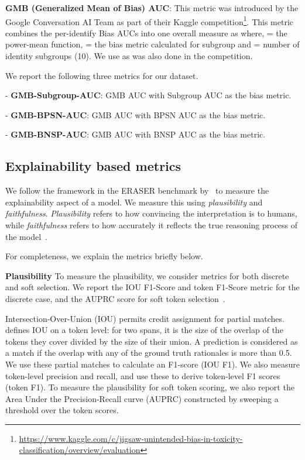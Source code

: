 \documentclass[letterpaper]{article} \usepackage{aaai21}  \usepackage{times}  \usepackage{helvet} \usepackage{courier}  \usepackage[hyphens]{url}  \usepackage{graphicx} \urlstyle{rm} \def\UrlFont{\rm}  \usepackage{natbib}  \usepackage{caption}
\begin{document}
\noindent\textbf{GMB (Generalized Mean of Bias) AUC}: This metric was introduced by the Google Conversation AI Team as part of their Kaggle competition\footnote{\url{https://www.kaggle.com/c/jigsaw-unintended-bias-in-toxicity-classification/overview/evaluation}}. This metric combines the per-identify Bias AUCs into one overall measure as  where,   = the  power-mean function,  = the bias metric  calculated for subgroup  and
 = number of identity subgroups (10). We use  as was also done in the competition.



\noindent We report the following three metrics for our dataset.
\begin{compactitem}
    \item[-] \textbf{GMB-Subgroup-AUC}: GMB AUC with Subgroup AUC as the bias metric.
    \item[-] \textbf{GMB-BPSN-AUC}: GMB AUC with BPSN AUC as the bias metric.
    \item[-] \textbf{GMB-BNSP-AUC}: GMB AUC with BNSP AUC as the bias metric.
\end{compactitem}






\subsection{Explainability based metrics}

We follow the framework in the ERASER benchmark by~\citet{deyoung2019eraser} to measure the explainability aspect of a model. We measure this using \textit{plausibility} and \textit{faithfulness}. \textit{Plausibility} refers to how convincing the interpretation is to humans,  while \textit{faithfulness} refers to how accurately it reflects the true reasoning process of the model~\cite{jacovi2020towards}.



For completeness, we explain the metrics briefly below.

\noindent\textbf{Plausibility}
To measure the plausibility, we consider metrics for both discrete and soft selection. We report the IOU F1-Score and token F1-Score metric for the discrete case, and the AUPRC score for soft token selection~\cite{deyoung2019eraser}. 

Intersection-Over-Union (IOU) permits credit assignment for partial matches.  \citet{deyoung2019eraser} defines IOU on a token level: for two spans, it is the size of the overlap of the tokens they cover divided by the size of their union. A prediction is considered as a match if the overlap with any of the ground truth rationales is more than 0.5. We use these partial matches to calculate an F1-score (IOU F1). We also measure token-level precision and recall, and use these to derive token-level F1 scores (token F1). To measure the plausibility for soft token scoring,
 we also report the Area Under the Precision-Recall curve (AUPRC) constructed by sweeping a threshold over the token scores.
\end{document}
